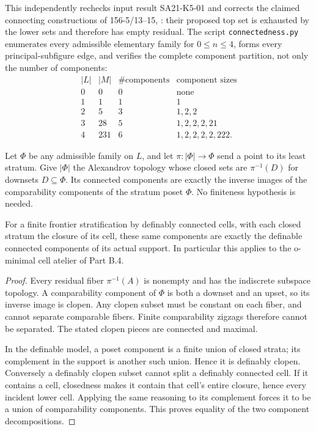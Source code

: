This independently rechecks input result SA21-K5-01 and corrects
the claimed connecting constructions of 156-5/13--15,
: their
proposed top set is exhausted by the lower sets and therefore
has empty residual. The script \texttt{connectedness.py}
enumerates every admissible elementary family for \(0\leq n\leq4\),
forms every principal-subfigure edge, and verifies the complete
component partition, not only the number of components:
\[
\begin{array}{c|r|r|l}
 |L|&|M|&\#\text{components}&\text{component sizes}\\ \hline
 0&0&0&\text{none}\\
 1&1&1&1\\
 2&5&3&1,2,2\\
 3&28&5&1,2,2,2,21\\
 4&231&6&1,2,2,2,2,222.
\end{array}
\]

\begin{theorem}
\label{SA21-B-figure-components}
Let \(\Phi\) be any admissible family on \(L\), and let
\(\pi:|\Phi|\to\Phi\) send a point to its least stratum.
Give \(|\Phi|\) the Alexandrov topology whose closed sets are
\(\pi^{-1}(D)\) for downsets \(D\subseteq\Phi\).
Its connected components are exactly the inverse images of
the comparability components of the stratum poset \(\Phi\).
No finiteness hypothesis is needed.

For a finite frontier stratification by definably connected
cells, with each closed stratum the closure of its cell, these
same components are exactly the definable connected components
of its actual support. In particular this applies to the
o-minimal cell atelier of Part B.4.
\end{theorem}

\begin{proof}
Every residual fiber \(\pi^{-1}(A)\) is nonempty and has the
indiscrete subspace topology. A comparability component of
\(\Phi\) is both a downset and an upset, so its inverse image
is clopen. Any clopen subset must be constant on each fiber,
and cannot separate comparable fibers. Finite comparability
zigzags therefore cannot be separated. The stated clopen
pieces are connected and maximal.

In the definable model, a poset component is a finite union
of closed strata; its complement in the support is another
such union. Hence it is definably clopen. Conversely a
definably clopen subset cannot split a definably connected
cell. If it contains a cell, closedness makes it contain
that cell's entire closure, hence every incident lower cell.
Applying the same reasoning to its complement forces it to
be a union of comparability components. This proves equality
of the two component decompositions.
\end{proof}


